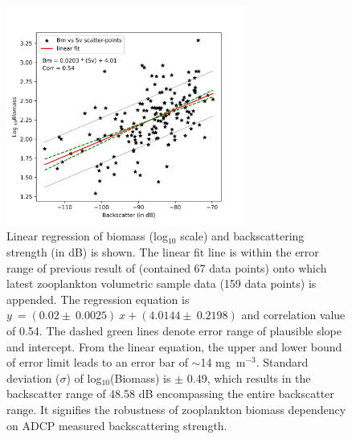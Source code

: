 \documentclass[authoryear,review,12pt]{elsarticle}
\begin{document}
\newpage
\begin{figure}[htbp]
	\centering
	\includegraphics[width=0.7\textwidth]{./figures/backscatter_vs_biomass.jpeg} 
	\captionsetup{justification=justified,font=footnotesize,skip=0.05\baselineskip,width=0.8\textwidth}
	\caption{Linear regression of biomass (log$_{10}$ scale) and backscattering strength (in dB) is shown. The linear fit line is within the error range of previous result of \citep{aparna2022seasonal} (contained 67 data points) onto which latest zooplankton volumetric sample data (159 data points) is appended. The regression equation is $y\ = (0.02 \pm\ 0.0025) \ x + (4.0144 \pm \ 0.2198) $ and correlation value of 0.54. The dashed green lines denote error range of plausible slope and intercept. From the linear equation, the upper and lower bound of error limit leads to an error bar of $\sim$14  mg~m$^{-3}$. Standard deviation ($\sigma$) of log$_{10}$(Biomass) is $\pm$ 0.49, which results in the backscatter range of 48.58 dB encompassing the entire backscatter range. It signifies the robustness of zooplankton biomass dependency on ADCP measured backscattering strength.}
	\label{fig:bstobm}
\end{figure}

\newpage
\end{document}
